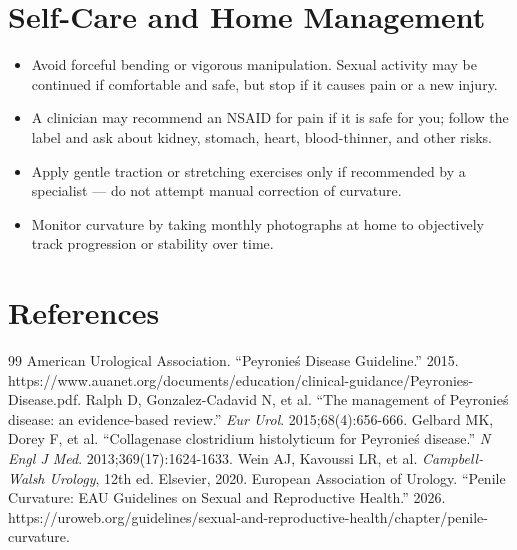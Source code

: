 \section*{Self-Care and Home Management}
\begin{itemize}
 \item Avoid forceful bending or vigorous manipulation. Sexual activity may be continued if comfortable and safe, but stop if it causes pain or a new injury.
 \item A clinician may recommend an NSAID for pain if it is safe for you; follow the label and ask about kidney, stomach, heart, blood-thinner, and other risks.
 \item Apply gentle traction or stretching exercises only if recommended by a specialist — do not attempt manual correction of curvature.
 \item Monitor curvature by taking monthly photographs at home to objectively track progression or stability over time.
\end{itemize}

\section*{References}
\begin{thebibliography}{99}
 American Urological Association. ``Peyronie\'s Disease Guideline.'' 2015. https://www.auanet.org/documents/education/clinical-guidance/Peyronies-Disease.pdf.
 Ralph D, Gonzalez-Cadavid N, et al. ``The management of Peyronie\'s disease: an evidence-based review.'' \textit{Eur Urol}. 2015;68(4):656-666.
 Gelbard MK, Dorey F, et al. ``Collagenase clostridium histolyticum for Peyronie\'s disease.'' \textit{N Engl J Med}. 2013;369(17):1624-1633.
 Wein AJ, Kavoussi LR, et al. \textit{Campbell-Walsh Urology}, 12th ed. Elsevier, 2020.
 European Association of Urology. ``Penile Curvature: EAU Guidelines on Sexual and Reproductive Health.'' 2026. https://uroweb.org/guidelines/sexual-and-reproductive-health/chapter/penile-curvature.
\end{thebibliography}
